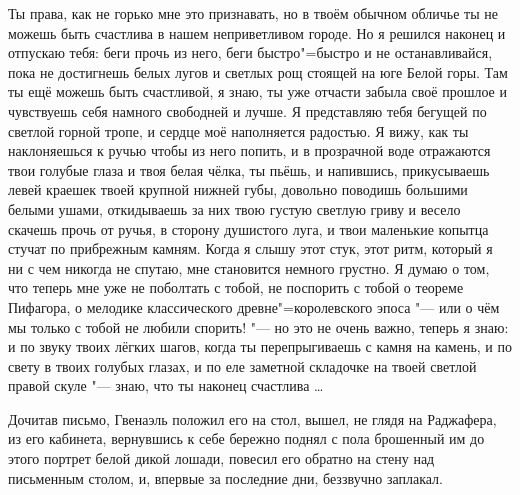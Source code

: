 Ты права, как не горько мне это признавать, но в твоём обычном обличье ты не
можешь быть счастлива в нашем неприветливом городе.
Но я решился наконец и отпускаю тебя: беги прочь из него, беги быстро"=быстро и
не останавливайся, пока не достигнешь белых лугов и светлых рощ стоящей на юге
Белой горы.
Там ты ещё можешь быть счастливой, я знаю, ты уже отчасти забыла своё прошлое и
чувствуешь себя намного свободней и лучше.
Я представляю тебя бегущей по светлой горной тропе, и сердце моё наполняется
радостью.
Я вижу, как ты наклоняешься к ручью чтобы из него попить, и в прозрачной воде
отражаются твои голубые глаза и твоя белая чёлка, ты пьёшь, и напившись,
прикусываешь левей краешек твоей крупной нижней губы, довольно поводишь большими
белыми ушами, откидываешь за них твою густую светлую гриву и весело скачешь
прочь от ручья, в сторону душистого луга, и твои маленькие копытца стучат по
прибрежным камням.
Когда я слышу этот стук, этот ритм, который я ни с чем никогда не спутаю, мне
становится немного грустно.
Я думаю о том, что теперь мне уже не поболтать с тобой, не поспорить с тобой о
теореме Пифагора, о мелодике классического древне"=королевского эпоса "--- или о
чём мы только с тобой не любили спорить! "--- но это не очень важно, теперь я
знаю: и по звуку твоих лёгких шагов, когда ты перепрыгиваешь с камня на камень,
и по свету в твоих голубых глазах, и по еле заметной складочке на твоей светлой
правой скуле "--- знаю, что ты наконец счастлива \ldots

\medskip
Дочитав письмо, Гвенаэль положил его на стол, вышел, не глядя на Раджафера, из
его кабинета, вернувшись к себе бережно поднял с пола брошенный им до этого
портрет белой дикой лошади, повесил его обратно на стену над письменным столом,
и, впервые за последние дни, беззвучно заплакал.
